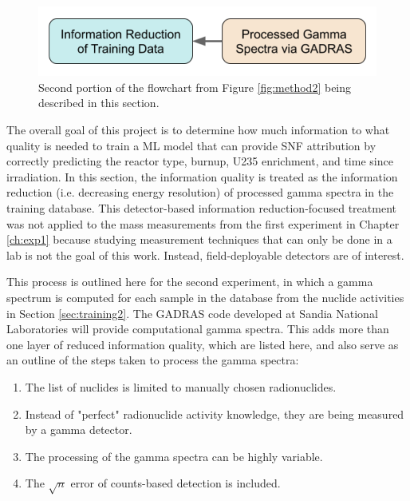 
\begin{figure}[H]
  \centering
  \includegraphics[width=0.7\linewidth]{./chapters/exp2/methodology2_2.png}
  \caption[Second portion of the flowchart from Figure \ref{fig:method2}]
          {Second portion of the flowchart from Figure \ref{fig:method2} being 
           described in this section.}
\end{figure}

The overall goal of this project is to determine how much information to what
quality is needed to train a  \gls{ML} model that can provide \gls{SNF}
attribution by correctly predicting the reactor type, burnup, \gls{U235}
enrichment, and time since irradiation.  In this section, the information
quality is treated as the information reduction (i.e. decreasing energy
resolution) of processed gamma spectra in the training database.  This
detector-based information reduction-focused treatment was not applied to the
mass measurements from the first experiment in Chapter \ref{ch:exp1} because
studying measurement techniques that can only be done in a lab is not the goal
of this work.  Instead, field-deployable detectors are of
interest.

This process is outlined here for the second experiment, in which a gamma
spectrum is computed for each sample in the database from the nuclide
activities in Section \ref{sec:training2}.  The \gls{GADRAS} code \cite{gadras}
developed at Sandia National Laboratories will provide computational gamma
spectra.  This adds more than one layer of reduced information quality, which
are listed here, and also serve as an outline of the steps taken to process the 
gamma spectra:
\begin{enumerate}
  \item \label{itm:1} The list of nuclides is limited to manually chosen 
        radionuclides.
  \item \label{itm:2} Instead of "perfect" radionuclide activity knowledge, 
        they are being measured by a gamma detector.
  \item \label{itm:3} The processing of the gamma spectra can be highly variable.
  \item \label{itm:4} The $\sqrt{n}$ error of counts-based detection is included. 
\end{enumerate}

